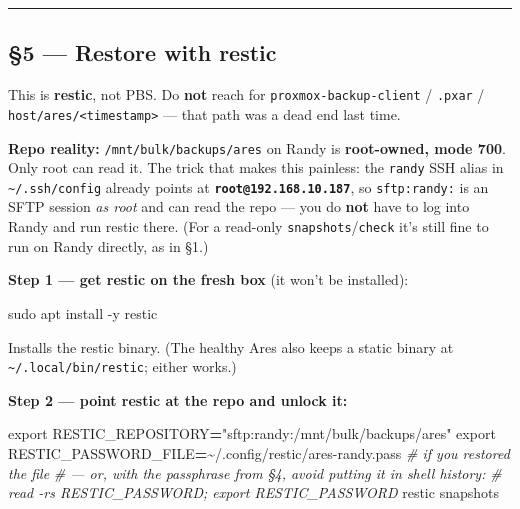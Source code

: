 \documentclass[
]{article}
\newenvironment{Shaded}{\begin{snugshade}}{\end{snugshade}}
\newcommand{\AttributeTok}[1]{\textcolor[rgb]{0.77,0.63,0.00}{#1}}
\newcommand{\BuiltInTok}[1]{#1}
\newcommand{\CommentTok}[1]{\textcolor[rgb]{0.56,0.35,0.01}{\textit{#1}}}
\newcommand{\ExtensionTok}[1]{#1}
\newcommand{\FunctionTok}[1]{\textcolor[rgb]{0.00,0.00,0.00}{#1}}
\newcommand{\NormalTok}[1]{#1}
\newcommand{\OperatorTok}[1]{\textcolor[rgb]{0.81,0.36,0.00}{\textbf{#1}}}
\newcommand{\StringTok}[1]{\textcolor[rgb]{0.31,0.60,0.02}{#1}}
\newcommand{\VariableTok}[1]{\textcolor[rgb]{0.00,0.00,0.00}{#1}}
\begin{document}
\begin{center}\rule{0.5\linewidth}{0.5pt}\end{center}

\hypertarget{restore-with-restic}{%
\subsection{§5 --- Restore with restic}\label{restore-with-restic}}

This is \textbf{restic}, not PBS. Do \textbf{not} reach for
\texttt{proxmox-backup-client} / \texttt{.pxar} /
\texttt{host/ares/\textless{}timestamp\textgreater{}} --- that path was
a dead end last time.

\textbf{Repo reality:} \texttt{/mnt/bulk/backups/ares} on Randy is
\textbf{root-owned, mode 700}. Only root can read it. The trick that
makes this painless: the \texttt{randy} SSH alias in
\texttt{\textasciitilde{}/.ssh/config} already points at
\textbf{\texttt{root@192.168.10.187}}, so \texttt{sftp:randy:} is an
SFTP session \emph{as root} and can read the repo --- you do
\textbf{not} have to log into Randy and run restic there. (For a
read-only \texttt{snapshots}/\texttt{check} it's still fine to run on
Randy directly, as in §1.)

\textbf{Step 1 --- get restic on the fresh box} (it won't be installed):

\begin{Shaded}
\begin{Highlighting}[]
\FunctionTok{sudo}\NormalTok{ apt install }\AttributeTok{{-}y}\NormalTok{ restic}
\end{Highlighting}
\end{Shaded}

Installs the restic binary. (The healthy Ares also keeps a static binary
at \texttt{\textasciitilde{}/.local/bin/restic}; either works.)

\textbf{Step 2 --- point restic at the repo and unlock it:}

\begin{Shaded}
\begin{Highlighting}[]
\BuiltInTok{export} \VariableTok{RESTIC\_REPOSITORY}\OperatorTok{=}\StringTok{"sftp:randy:/mnt/bulk/backups/ares"}
\BuiltInTok{export} \VariableTok{RESTIC\_PASSWORD\_FILE}\OperatorTok{=}\NormalTok{\textasciitilde{}/.config/restic/ares{-}randy.pass   }\CommentTok{\# if you restored the file}
\CommentTok{\# — or, with the passphrase from §4, avoid putting it in shell history:}
\CommentTok{\# read {-}rs RESTIC\_PASSWORD; export RESTIC\_PASSWORD}
\ExtensionTok{restic}\NormalTok{ snapshots}
\end{Highlighting}
\end{Shaded}
\end{document}
